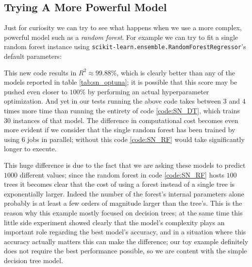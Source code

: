 \subsection{Trying A More Powerful Model}

Just for curiosity we can try to see what happens when we use a more complex, powerful model such as a \emph{random forest}. For example we can try to fit a single random forest instance using \texttt{scikit-learn.ensemble.RandomForestRegressor}'s default parameters:

This new code results in $R^2\approx 99.88\%$, which is clearly better than any of the models reported in table \ref{tab:sn_optuna}; it is possible that this score may be pushed even closer to $100\%$ by performing an actual hyperparameter optimization. And yet in our tests running the above code takes between $3$ and $4$ times more time than running the entirety of code \ref{code:SN_DT}, which trains 30 instances of that model. The difference in computational cost becomes even more evident if we consider that the single random forest has been trained by using $6$ jobs in parallel; without this code \ref{code:SN_RF} would take significantly longer to execute.

This huge difference is due to the fact that we are asking these models to predict $1000$ different values; since the random forest in code \ref{code:SN_RF} hosts $100$ trees it becomes clear that the cost of using a forest instead of a single tree is exponentially larger. Indeed the number of the forest's internal parameters alone probably is at least a few orders of magnitude larger than the tree's.
This is the reason why this example mostly focused on decision trees; at the same time this little side experiment showed clearly that the model's complexity plays an important role regarding the best model's accuracy, and in a situation where this accuracy actually matters this can make the difference; our toy example definitely does not require the best performance possible, so we are content with the simple decision tree model.



